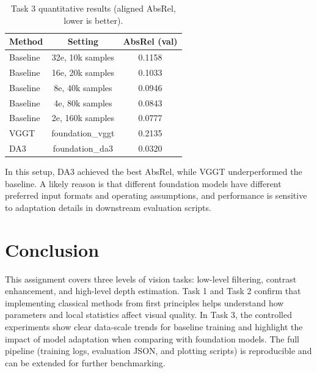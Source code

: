 \documentclass[final]{cvpr}
\begin{document}
\begin{table}[htbp]
\centering
\small
\begin{tabular}{lcc}
\toprule
Method & Setting & AbsRel (val) \\
\midrule
Baseline & 32e, 10k samples & 0.1158 \\
Baseline & 16e, 20k samples & 0.1033 \\
Baseline & 8e, 40k samples & 0.0946 \\
Baseline & 4e, 80k samples & 0.0843 \\
Baseline & 2e, 160k samples & 0.0777 \\
VGGT & foundation\_vggt & 0.2135 \\
DA3 & foundation\_da3 & 0.0320 \\
\bottomrule
\end{tabular}
\caption{Task 3 quantitative results (aligned AbsRel, lower is better).}
\label{tab:task3_results}
\end{table}

In this setup, DA3 achieved the best AbsRel, while VGGT underperformed the baseline. A likely reason is that different foundation models have different preferred input formats and operating assumptions, and performance is sensitive to adaptation details in downstream evaluation scripts.

\section{Conclusion}

This assignment covers three levels of vision tasks: low-level filtering, contrast enhancement, and high-level depth estimation. Task 1 and Task 2 confirm that implementing classical methods from first principles helps understand how parameters and local statistics affect visual quality. In Task 3, the controlled experiments show clear data-scale trends for baseline training and highlight the impact of model adaptation when comparing with foundation models. The full pipeline (training logs, evaluation JSON, and plotting scripts) is reproducible and can be extended for further benchmarking.

{\small


}
\end{document}
